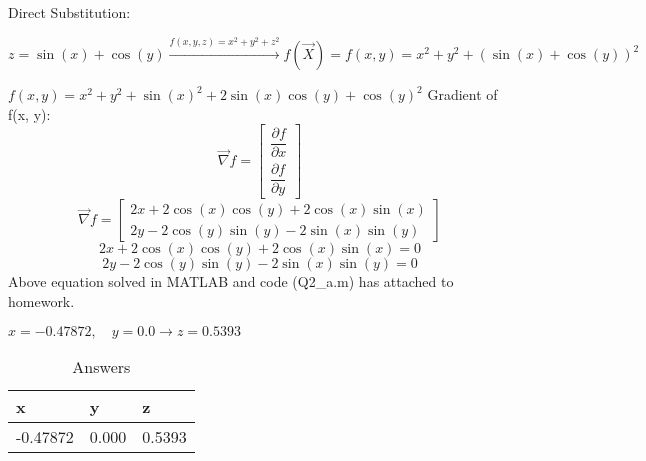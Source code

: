 Direct Substitution:


$z = \sin(x) + \cos(y) \xrightarrow{f(x, y, z) = x^2 + y^2 + z^ 2}
f(\vec{X}) = f(x, y) = x^2 + y^2 + (\sin(x)+\cos(y))^2
$


$f(x, y) = x^2 + y^2 + \sin(x)^2 + 2\sin(x)\cos(y) + \cos(y)^2$
Gradient of f(x, y):
$$\vec{\nabla} f = \begin{bmatrix}
	\dfrac{\partial f}{\partial x} \\[6pt]
	\dfrac{\partial f}{\partial y}
\end{bmatrix} $$
$$\vec{\nabla} f = \begin{bmatrix}
	2x + 2\cos(x)\cos(y) + 2\cos(x)\sin(x) \\
	2y - 2\cos(y)\sin(y) - 2\sin(x)\sin(y)
\end{bmatrix} $$
$$	2x + 2\cos(x)\cos(y) + 2\cos(x)\sin(x)=  0 $$
$$2y - 2\cos(y)\sin(y) - 2\sin(x)\sin(y)= 0$$
Above equation solved in MATLAB and code (Q2\_a.m) has attached to homework.


$x = -0.47872, \quad y = 0.0 \to z = 0.5393 $
\begin{table}[H]
	\caption {Answers} \label{ans} 
	\begin{center}
		\begin{tabular}{| l | l | l |}
			\hline
			x & y & z \TBstrut \\
			\hline
			-0.47872 & 0.000 & 0.5393 \Tstrut\\
			\hline
		\end{tabular}
	\end{center}
\end{table}


